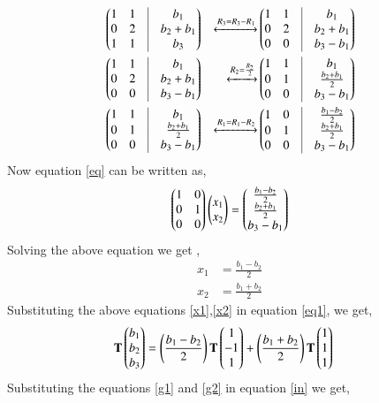 \documentclass[journal,12pt,twocolumn]{IEEEtran}
\begin{document}
\begin{align}
&\myvec{1& 1 &\vrule & b_1 \\ 0 & 2 & \vrule& b_2+b_1\\ 1 & 1 &\vrule & b_3}&\xleftrightarrow{R_3=R_3-R_1}&\myvec{1& 1 &\vrule & b_1 \\ 0 & 2 & \vrule& b_2+b_1\\ 0 & 0 &\vrule & b_3-b_1}\\
&\myvec{1& 1 &\vrule & b_1 \\ 0 & 2 & \vrule& b_2+b_1\\ 0 & 0 &\vrule & b_3-b_1}&\xleftrightarrow{R_2=\frac{R_2}{2}}&\myvec{1& 1 &\vrule & b_1 \\ 0 & 1 & \vrule& \frac{b_2+b_1}{2}\\ 0 & 0 &\vrule & b_3-b_1}\\
&\myvec{1& 1 &\vrule & b_1 \\ 0 & 1 & \vrule& \frac{b_2+b_1}{2}\\ 0 & 0 &\vrule & b_3-b_1}&\xleftrightarrow{R_1=R_1-R_2}&\myvec{1& 0 &\vrule & \frac{b_1-b_2}{2} \\ 0 & 1 & \vrule& \frac{b_2+b_1}{2}\\ 0 & 0 &\vrule & b_3-b_1}
\end{align}
Now equation \eqref{eq} can be written as,
\begin{align}
    \begin{pmatrix}1 & 0\\0 & 1 \\ 0& 0\end{pmatrix}\begin{pmatrix}x_1\\x_2\end{pmatrix}=\begin{pmatrix}\frac{b_1-b_2}{2}\\\frac{b_2+b_1}{2}\\b_3-b_1\end{pmatrix}
\end{align}
Solving the above equation we get ,
\begin{align}
    x_1&=\frac{b_1-b_2}{2}\label{x1}\\
    x_2&=\frac{b_1+b_2}{2}\label{x2}
\end{align}
Substituting the above equations \eqref{x1},\eqref{x2} in equation \eqref{eq1}, we get,
\begin{align}
    \mathbf{T}\begin{pmatrix}b_1\\b_2\\b_3\end{pmatrix}&=\left(\frac{b_1-b_2}{2}\right)\mathbf{T}\begin{pmatrix}1\\-1\\1\end{pmatrix}+\left(\frac{b_1+b_2}{2}\right)\mathbf{T}\begin{pmatrix}1\\1\\1\end{pmatrix}\label{in}
\end{align}
Substituting the equations \eqref{g1} and \eqref{g2} in equation \eqref{in} we get,
\end{document}

